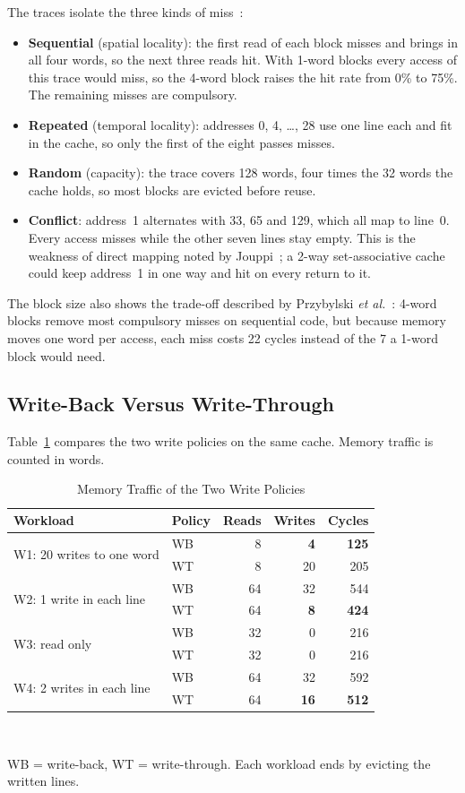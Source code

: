 \documentclass[conference]{IEEEtran}
\begin{document}
The traces isolate the three kinds of miss~\cite{hillsmith1989}:
\begin{itemize}
\item \textbf{Sequential} (spatial locality): the first read of each block misses and brings in all four words, so the next three reads hit. With 1-word blocks every access of this trace would miss, so the 4-word block raises the hit rate from 0\% to 75\%. The remaining misses are compulsory.
\item \textbf{Repeated} (temporal locality): addresses 0, 4, \dots, 28 use one line each and fit in the cache, so only the first of the eight passes misses.
\item \textbf{Random} (capacity): the trace covers 128 words, four times the 32 words the cache holds, so most blocks are evicted before reuse.
\item \textbf{Conflict}: address~1 alternates with 33, 65 and 129, which all map to line~0. Every access misses while the other seven lines stay empty. This is the weakness of direct mapping noted by Jouppi~\cite{jouppi1990}; a 2-way set-associative cache could keep address~1 in one way and hit on every return to it.
\end{itemize}

The block size also shows the trade-off described by Przybylski \emph{et al.}~\cite{przybylski1988}: 4-word blocks remove most compulsory misses on sequential code, but because memory moves one word per access, each miss costs 22 cycles instead of the 7 a 1-word block would need.

\subsection{Write-Back Versus Write-Through}
Table~\ref{tab:traffic} compares the two write policies on the same cache. Memory traffic is counted in words.

\begin{table}[t]
\caption{Memory Traffic of the Two Write Policies}
\label{tab:traffic}
\centering
\footnotesize
\begin{tabular}{@{}llrrr@{}}
\toprule
Workload & Policy & Reads & Writes & Cycles \\
\midrule
\multirow{2}{*}{W1: 20 writes to one word} & WB & 8 & \textbf{4} & \textbf{125} \\
 & WT & 8 & 20 & 205 \\
\midrule
\multirow{2}{*}{W2: 1 write in each line} & WB & 64 & 32 & 544 \\
 & WT & 64 & \textbf{8} & \textbf{424} \\
\midrule
\multirow{2}{*}{W3: read only} & WB & 32 & 0 & 216 \\
 & WT & 32 & 0 & 216 \\
\midrule
\multirow{2}{*}{W4: 2 writes in each line} & WB & 64 & 32 & 592 \\
 & WT & 64 & \textbf{16} & \textbf{512} \\
\bottomrule
\end{tabular}
\\[2pt]
\raggedright\scriptsize WB = write-back, WT = write-through. Each workload ends by evicting the written lines.
\end{table}
\end{document}
